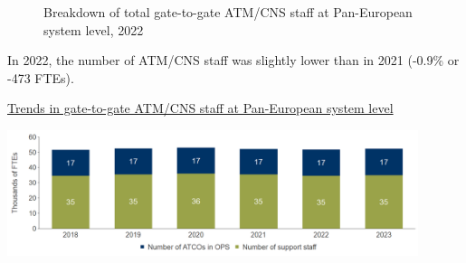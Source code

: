 \documentclass[
  letterpaper,
  DIV=11,
  numbers=noendperiod]{scrreprt}
\newenvironment{tightcenter}{%
  \setlength\topsep{5pt}
  \setlength\parskip{0pt}
  \bfseries
  \begin{center}
}{%
  \end{center}
}
\begin{document}
\begin{figure}


\caption{\label{fig-figure-2-6}Breakdown of total gate-to-gate ATM/CNS
staff at Pan-European system level, 2022}

\end{figure}%

In 2022, the number of ATM/CNS staff was slightly lower than in 2021
(-0.9\% or -473 FTEs).

\newpage{}

\begin{tightcenter}
\hfill\break
\underline{Trends in gate-to-gate ATM/CNS staff at Pan-European system level}
\end{tightcenter}

\includegraphics[width=0.9\textwidth,height=0.9\textheight]{figures/figure-2-7-1-hlsr_evo_staff.png}
\end{document}
